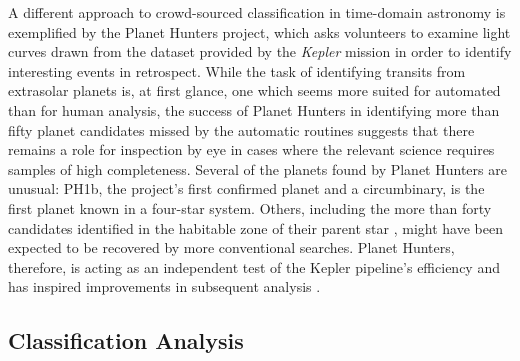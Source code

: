 \documentclass{ar2e}
\begin{document}
A different approach to crowd-sourced classification in time-domain astronomy is
exemplified by the Planet Hunters project, which asks volunteers to examine
light curves drawn from the dataset provided by the \emph{Kepler} mission in
order to identify interesting events in retrospect. While the task of
identifying transits from extrasolar planets is, at first glance, one which
seems more suited for automated than for human analysis, the success of Planet
Hunters in identifying more than fifty planet candidates missed by the automatic
routines suggests that there remains a role for inspection by eye in cases where
the relevant science requires samples of high completeness. Several of the
planets found by Planet Hunters are unusual: PH1b, the project's first confirmed
planet \citep{Schwamb++2013} and a circumbinary, is the first planet known in a
four-star system. Others, including the more than forty candidates identified in
the habitable zone of their parent star \citep{Wang++2013}, might have been
expected to be recovered by more conventional searches. Planet Hunters,
therefore, is acting as an independent test of the Kepler pipeline's efficiency
\citep{Schwamb++2012} and has inspired improvements in subsequent analysis
\citep{Batalha++2013}. 



\subsection{Classification Analysis}
\label{sec:class:analysis}
\end{document}
